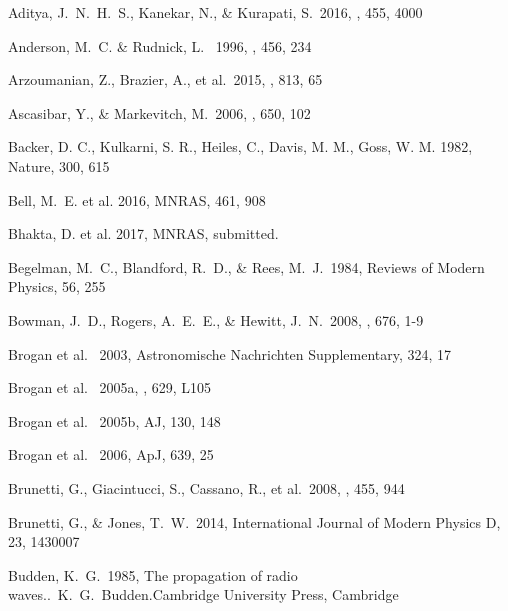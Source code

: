 \documentclass[11pt]{article}
\begin{document}
\begin{thebibliography}{}

 Aditya, J.~N.~H.~S., Kanekar, N., \& Kurapati, S.\ 2016, \mnras, 455, 4000 

 Anderson, M.~C. \& Rudnick, L. \ 1996, \apj, 456, 234

 Arzoumanian, Z., Brazier, A., et al.\ 2015, \apj, 813, 65 


 Ascasibar, Y., \& Markevitch, M.\ 2006, \apj, 650, 102 


Backer, D. C., Kulkarni, S. R., Heiles, C., Davis, M. M., Goss, W. M. 1982, Nature, 300, 615

Bell, M.~E. et al. 2016, MNRAS, 461, 908

Bhakta, D. et al. 2017, MNRAS, submitted.

 Begelman, M.~C.,
Blandford, R.~D., \& Rees, M.~J.\ 1984, Reviews of Modern Physics, 56, 255

 Bowman, J.~D., Rogers, A.~E.~E., \& Hewitt, J.~N.\ 2008, \apj, 676, 1-9 

 Brogan et al. \ 2003, Astronomische Nachrichten Supplementary,  324, 17

 Brogan et al. \ 2005a, \apjl, 629, L105 

 Brogan et al. \ 2005b, AJ, 130, 148 

 Brogan et al. \ 2006, ApJ, 639, 25 


 Brunetti, G., Giacintucci, S., Cassano, R., et al.\ 2008, \nat, 455, 944 


 Brunetti, G., \& Jones, T.~W.\ 2014, International Journal of Modern Physics D, 23, 1430007 

 Budden, K.~G.\ 1985, The propagation of radio waves..~K.~G.~Budden.Cambridge University Press, Cambridge  


\end{thebibliography}
\end{document}
